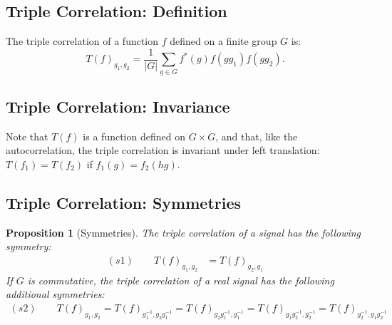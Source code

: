 \documentclass{article}
\newtheorem{proposition}{Proposition}
\begin{document}
\subsection{Triple Correlation: Definition}

The triple correlation of a function $f$ defined on a finite group $G$ is:
$$
T(f)_{g_1, g_2}=\frac{1}{|G|} \sum_{g \in G} f^*(g) f\left(g g_1\right) f\left(g g_2\right) .
$$

\subsection{Triple Correlation: Invariance}
Note that $T(f)$ is a function defined on $G \times G$, and that, like the autocorrelation, the triple correlation is invariant under left translation: $T(f_1)=T(f_2)$ if $f_1(g)=f_2(h g)$.

\subsection{Triple Correlation: Symmetries}

\begin{proposition}[Symmetries]
The triple correlation of a signal has the following symmetry:
\begin{align*}
     (s1) \qquad T(f)_{g_1, g_2} &= T(f)_{g_2, g_1}
\end{align*}
If $G$ is commutative, the triple correlation of a real signal has the following additional symmetries:
\begin{align*}
     (s2) \qquad T(f)_{g_1, g_2}
     = T(f)_{g^{-1}_1, g_2g^{-1}_1}
     = T(f)_{g_2g^{-1}_1, g^{-1}_1}
     = T(f)_{g_1g^{-1}_2, g^{-1}_2}
     = T(f)_{g^{-1}_2, g_1g^{-1}_2}
\end{align*}
\end{proposition}
\end{document}
